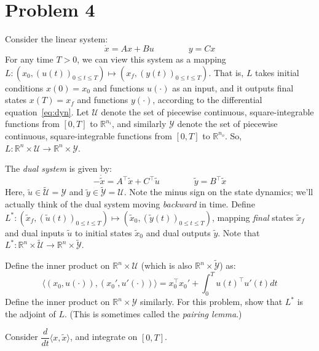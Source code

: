\documentclass[11pt]{report}
\theoremstyle{definition}
\newcommand{\T}{\intercal}
\begin{document}
\section*{Problem 4}
Consider the linear system:
\begin{equation}
\label{eq:dyn}
\dot x = Ax + Bu \qquad \qquad y = Cx
\end{equation}
For any time $T > 0$, we can view this system as a mapping $L :(x_0,(u(t))_{0 \le t \le T}) \mapsto (x_f,(y(t))_{0 \le t \le T})$. That is, $L$ takes initial conditions $x(0) = x_0$ and functions $u(\cdot)$ as an input, and it outputs final states $x(T) = x_f$ and functions $y(\cdot)$, according to the differential equation~\eqref{eq:dyn}. Let $\mathcal{U}$ denote the set of piecewise continuous, square-integrable functions from $[0,T]$ to $\mathbb{R}^{n_i}$, and similarly $\mathcal{Y}$ denote the set of piecewise continuous, square-integrable functions from $[0,T]$ to $\mathbb{R}^{n_o}$. So, $L : \mathbb{R}^n \times \mathcal{U} \rightarrow \mathbb{R}^n \times \mathcal{Y}$.

\justify
The {\em dual system} is given by:
\[
- \dot {\tilde x} = A^\T \tilde x + C^\T \tilde u \qquad \qquad \tilde y = B^\T \tilde x
\]
Here, $\tilde u \in \tilde {\mathcal{U}} = \mathcal{Y}$ and $\tilde y \in \tilde {\mathcal{Y}} = \mathcal{U}$. Note the minus sign on the state dynamics; we'll actually think of the dual system moving {\em backward} in time. Define $L^*: (\tilde x_f,(\tilde u(t))_{0 \le t \le T}) \mapsto (\tilde x_0,(\tilde y(t))_{0 \le t \le T})$, mapping {\em final} states $\tilde x_f$ and dual inputs $\tilde u$ to initial states $\tilde x_0$ and dual outputs $\tilde y$. Note that $L^* : \mathbb{R}^n \times \tilde {\mathcal{U}} \rightarrow \mathbb{R}^n \times \tilde {\mathcal{Y}}$.

\justify
Define the inner product on $\mathbb{R}^n \times \mathcal{U}$ (which is also $\mathbb{R}^n \times \tilde {\mathcal{Y}}$) as:
\[
\langle (x_0, u(\cdot)), (x_0', u'(\cdot)) \rangle =
x_0^\T x_0' + \int_0^T u(t)^\T u'(t) dt
\]
\justify
Define the inner product on $\mathbb{R}^n \times \mathcal{Y}$ similarly. For this problem, show that $L^*$ is the adjoint of $L$. (This is sometimes called the {\em pairing lemma}.)

 Consider $\dfrac{d}{dt} \langle x, \tilde x \rangle$, and integrate on $[0,T]$.

\end{document}
